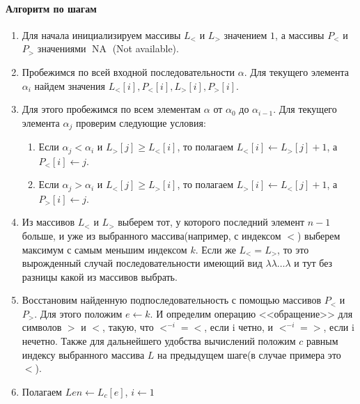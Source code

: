 \documentclass[12pt]{article}
\newcommand{\NA}{\operatorname{NA}}
\begin{document}
\paragraph{Алгоритм по шагам}
\begin{enumerate}
    \item Для начала инициализируем массивы $ L_< $ и $ L_> $ значением $ 1 $, а массивы $ P_< $ и $ P_> $
    значениями $ \NA $ (Not available).

    \item Пробежимся по всей входной последовательности $ \alpha $. Для текущего элемента $ \alpha_i $
    найдем значения $ L_<[i],P_<[i],L_>[i],P_>[i] $. 

    \item Для этого пробежимся по всем элементам $ \alpha $ от $ \alpha_0 $ до $ \alpha_{i - 1} $. Для
    текущего элемента $ \alpha_j $ проверим следующие условия:
    \begin{enumerate}
        \item Если $ \alpha_j < \alpha_i $ и $ L_>[j] \ge L_<[i] $, то
        полагаем $ L_<[i] \leftarrow L_>[j] + 1 $, а $ P_<[i] \leftarrow j $.
        
        \item Если $ \alpha_j > \alpha_i $ и $ L_<[j] \ge L_>[i] $, то
        полагаем $ L_>[i] \leftarrow L_<[j] + 1 $, а $ P_>[i] \leftarrow j $.
    \end{enumerate}

    \item Из массивов $ L_< $ и $ L_> $ выберем тот, у которого последний элемент $ n - 1 $ больше,
    и уже из выбранного массива(например, с индексом $ < $) выберем максимум с самым меньшим индексом $ k $.
    Если же $ L_< = L_> $, то это вырожденный случай последовательности имеющий вид 
    $ \lambda \lambda \dots \lambda $ и тут без разницы какой из массивов выбрать.

    \item Восстановим найденную подпоследовательность с помощью массивов $ P_< $ и $ P_> $. Для этого положим
    $ e \leftarrow k$. И определим операцию <<обращение>> для символов $>$ и $<$, такую, что $<^{-i} = <$, если
    i четно, и $<^{-i} = >$, если i нечетно. Также для дальнейшего удобства вычислений положим $ c $ равным
    индексу выбранного массива $ L $ на предыдущем шаге(в случае примера это $ < $).

    \item Полагаем $ Len \leftarrow L_c[e]$, $ i \leftarrow 1 $


\end{enumerate}
\end{document}
